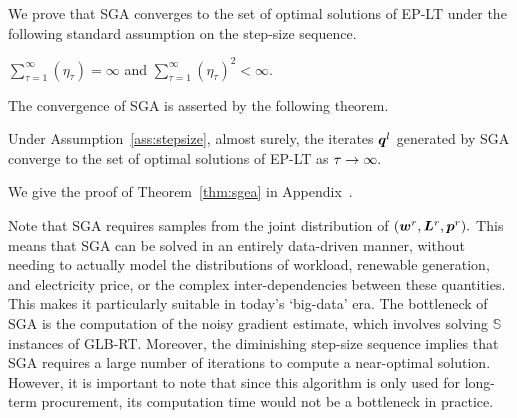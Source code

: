 We prove that SGA converges to the set of optimal solutions of
EP-LT under the following standard assumption on the step-size
sequence.
\begin{assumption}
	\label{ass:stepsize}
	$\sum_{\tau = 1}^{\infty}(\eta_{\tau}) = \infty $ and
        $\sum_{\tau = 1}^{\infty}(\eta_{\tau})^2 < \infty$.
\end{assumption}
The convergence of SGA is asserted by the following theorem.
\begin{theorem}
	\label{thm:sgea}
	Under Assumption~\ref{ass:stepsize}, almost surely, the iterates
	$\boldsymbol{q}^l$ generated by SGA converge to the set of optimal
	solutions of EP-LT as $\tau \rightarrow \infty.$
\end{theorem}
We give the proof of Theorem~\ref{thm:sgea} in
Appendix~.



      Note that SGA requires samples from the joint distribution of
      $(\boldsymbol{w}^r,\boldsymbol{L}^r,\boldsymbol{p}^r).$ This means that SGA
      can be solved in an entirely data-driven manner, without needing
      to actually model the distributions of workload, renewable
      generation, and electricity price, or the complex
      inter-dependencies between these quantities. This makes it
      particularly suitable in today's `big-data' era. The bottleneck
      of SGA is the computation of the noisy gradient estimate, which
      involves solving $\mathbb{S}$ instances of GLB-RT. Moreover, the
      diminishing step-size sequence implies that SGA requires a large
      number of iterations to compute a near-optimal
      solution. However, it is important to note that since this
      algorithm is only used for long-term procurement, its
      computation time would not be a bottleneck in practice.


